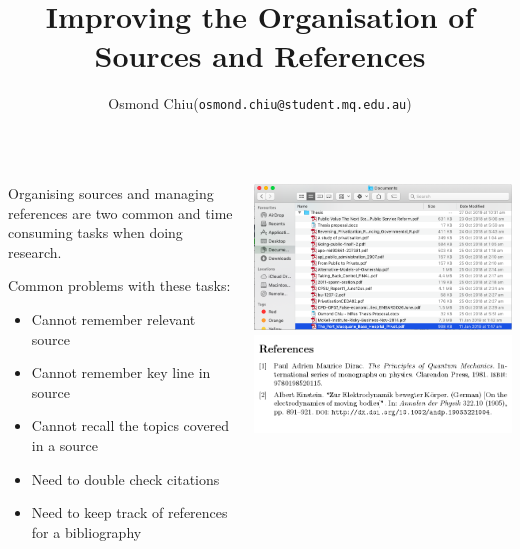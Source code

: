 \documentclass[unknownkeysallowed,usepdftitle=false, parskip=full, aspectratio=169]{beamer}
\title{Improving the Organisation of Sources and References}
\author{Osmond Chiu\inst (\texttt{osmond.chiu@student.mq.edu.au})}
\institute{Macquarie University}
\newcommand{\secvariable}{nothing}
\newcommand{\mysection}[1]{\renewcommand{\secvariable}{#1}
}
\begin{document}
\mysection{abstract}
\begin{frame}\label{\secvariable}

\parbox{\linewidth}{

\begin{columns}[t]
    \begin{column}[c]{0.5\textwidth}

Organising sources and managing references are two common and time consuming tasks when doing research.

 \vspace{12pt}

Common problems with these tasks:
\begin{itemize}
\item Cannot remember relevant source
\item Cannot remember key line in source
\item Cannot recall the topics covered in a source
\item Need to double check citations
\item Need to keep track of references for a bibliography
\end{itemize}

 \end{column}
    \begin{column}[c]{0.5\textwidth}
\includegraphics[width=1.5\textwidth,height=0.55\textheight,keepaspectratio]{figure/pdf.png}\\
\includegraphics[width=1.05\textwidth,height=0.5\textheight,keepaspectratio]{figure/bibliography.png}\\


\end{column}
\end{columns}}
\end{frame}
\end{document}
